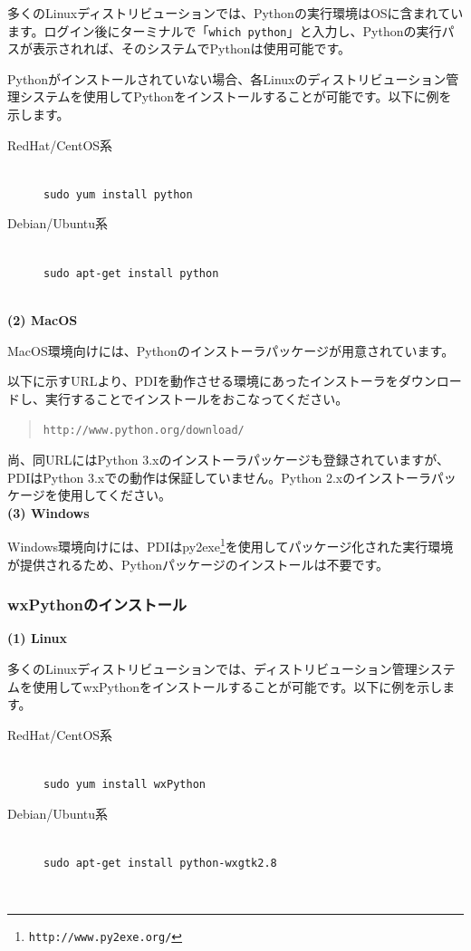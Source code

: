 \documentclass[a4paper,11pt]{jarticle}
\begin{document}
多くのLinuxディストリビューションでは、Pythonの実行環境はOSに含まれています。ログイン後にターミナルで「{\tt which python}」と入力し、Pythonの実行パスが表示されれば、そのシステムでPythonは使用可能です。

Pythonがインストールされていない場合、各Linuxのディストリビューション管理システムを使用してPythonをインストールすることが可能です。以下に例を示します。

\begin{description}
\item[RedHat/CentOS系] {\ } \\
{\tt sudo yum install python} \\
\item[Debian/Ubuntu系] {\ } \\
{\tt sudo apt-get install python}\\
\end{description}
{\ }\\


\textbf{(2) MacOS}

MacOS環境向けには、Pythonのインストーラパッケージが用意されています。

以下に示すURLより、PDIを動作させる環境にあったインストーラをダウンロードし、実行することでインストールをおこなってください。
\begin{quote}
{\tt http://www.python.org/download/}
\end{quote}
尚、同URLにはPython 3.xのインストーラパッケージも登録されていますが、PDIはPython
3.xでの動作は保証していません。Python 2.xのインストーラパッケージを使用してください。
{\ }\\


\textbf{(3) Windows}

Windows環境向けには、PDIはpy2exe\footnote{\tt http://www.py2exe.org/}を使用してパッケージ化された実行環境が提供されるため、Pythonパッケージのインストールは不要です。
{\ }\\


\subsubsection{wxPythonのインストール}

\textbf{(1) Linux}

多くのLinuxディストリビューションでは、ディストリビューション管理システムを使用してwxPythonをインストールすることが可能です。以下に例を示します。

\begin{description}
\item[RedHat/CentOS系] {\ }\\
{\tt sudo yum install wxPython}\\
\item[Debian/Ubuntu系] {\ }\\
{\tt sudo apt-get install python-wxgtk2.8}
\end{description}
{\ }\\
\end{document}
